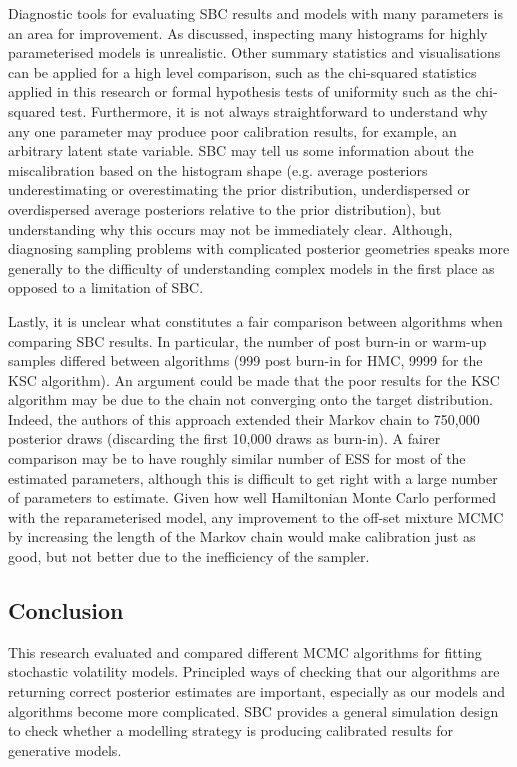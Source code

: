 \documentclass[12pt, a4paper]{article}
\begin{document}
Diagnostic tools for evaluating SBC results and models with many parameters is an area for improvement. As discussed, inspecting many histograms for highly parameterised models is unrealistic. Other summary statistics and visualisations can be applied for a high level comparison, such as the chi-squared statistics applied in this research or formal hypothesis tests of uniformity such as the chi-squared test. Furthermore, it is not always straightforward to understand why any one parameter may produce poor calibration results, for example, an arbitrary latent state variable. SBC may tell us some information about the miscalibration based on the histogram shape (e.g. average posteriors underestimating or overestimating the prior distribution, underdispersed or overdispersed average posteriors relative to the prior distribution), but understanding why this occurs may not be immediately clear. Although, diagnosing sampling problems with complicated posterior geometries speaks more generally to the difficulty of understanding complex models in the first place as opposed to a limitation of SBC.

Lastly, it is unclear what constitutes a fair comparison between algorithms when comparing SBC results. In particular, the number of post burn-in or warm-up samples differed between algorithms (999 post burn-in for HMC, 9999 for the KSC algorithm). An argument could be made that the poor results for the KSC algorithm may be due to the chain not converging onto the target distribution. Indeed, the authors of this approach extended their Markov chain to 750,000 posterior draws (discarding the first 10,000 draws as burn-in). A fairer comparison may be to have roughly similar number of ESS for most of the estimated parameters, although this is difficult to get right with a large number of parameters to estimate. Given how well Hamiltonian Monte Carlo performed with the reparameterised model, any improvement to the off-set mixture MCMC by increasing the length of the Markov chain would make calibration just as good, but not better due to the inefficiency of the sampler. 

\subsection{Conclusion}
This research evaluated and compared different MCMC algorithms for fitting stochastic volatility models. Principled ways of checking that our algorithms are returning correct posterior estimates are important, especially as our models and algorithms become more complicated. SBC provides a general simulation design to check whether a modelling strategy is producing calibrated results for generative models.
\end{document}
